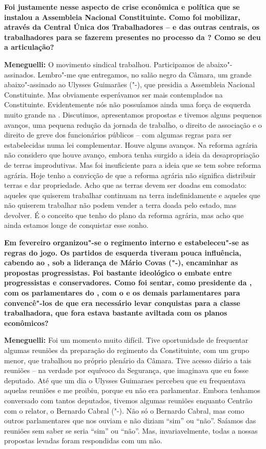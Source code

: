 \textbf{Foi justamente nesse aspecto de crise econômica e política que
se instalou a Assembleia Nacional Constituinte. Como foi mobilizar,
através da Central Única dos Trabalhadores --  e das outras centrais,
os trabalhadores para se fazerem presentes no processo da ? Como se
deu a articulação?}

\textbf{Meneguelli:} O movimento sindical trabalhou. Participamos de
abaixo"-assinados. Lembro"-me que entregamos, no salão negro da Câmara, um
grande abaixo"-assinado ao Ulysses Guimarães ("-), que presidia a
Assembleia Nacional Constituinte. Mas obviamente esperávamos ser mais
contemplados na Constituinte. Evidentemente nós não possuíamos ainda uma
força de esquerda muito grande na . Discutimos, apresentamos
propostas e tivemos alguns pequenos avanços, uma pequena redução da
jornada de trabalho, o direito de associação e o direito de greve dos
funcionários públicos -- com algumas regras para ser estabelecidas numa
lei complementar. Houve alguns avanços. Na reforma agrária não considero
que houve avanço, embora tenha surgido a ideia da desapropriação de
terras improdutivas. Mas foi insuficiente para a ideia que se tem sobre
reforma agrária. Hoje tenho a convicção de que a reforma agrária não
significa distribuir terras e dar propriedade. Acho que as terras devem
ser doadas em comodato: aqueles que quiserem trabalhar continuam na
terra indefinidamente e aqueles que não quiserem trabalhar não podem
vender a terra doada pelo estado, mas devolver. É o conceito que tenho
do plano da reforma agrária, mas acho que ainda estamos longe de
conquistar esse sonho.

\textbf{Em fevereiro organizou"-se o regimento interno e estabeleceu"-se
as regras do jogo. Os partidos de esquerda tiveram pouca influência,
cabendo ao , sob a liderança de Mário Covas ("-), encaminhar as
propostas progressistas. Foi bastante ideológico o embate entre
progressistas e conservadores. Como foi sentar, como presidente da ,
com os parlamentares do , com o  e os demais parlamentares para
convencê"-los de que era necessário levar conquistas para a classe
trabalhadora, que fora estava bastante aviltada com os planos
econômicos?}

\textbf{Meneguelli:} Foi um momento muito difícil. Tive oportunidade de
frequentar algumas reuniões da preparação do regimento da Constituinte,
com um grupo menor, que trabalhou no próprio plenário da Câmara. Tive
acesso diário a tais reuniões -- na verdade por equívoco da Segurança,
que imaginava que eu fosse deputado. Até que um dia o Ulysses Guimaraes
percebeu que eu frequentava aquelas reuniões e me proibiu, porque eu não
era parlamentar. Embora tenhamos conversado com tantos deputados,
tivemos algumas reuniões enquanto Centrão com o relator, o Bernardo
Cabral ("-). Não só o Bernardo Cabral, mas como outros
parlamentares que nos ouviam e não diziam ``sim'' ou ``não''. Saíamos
das reuniões sem saber se seria ``sim'' ou ``não''. Mas,
invariavelmente, todas a nossas propostas levadas foram respondidas com
um não.

